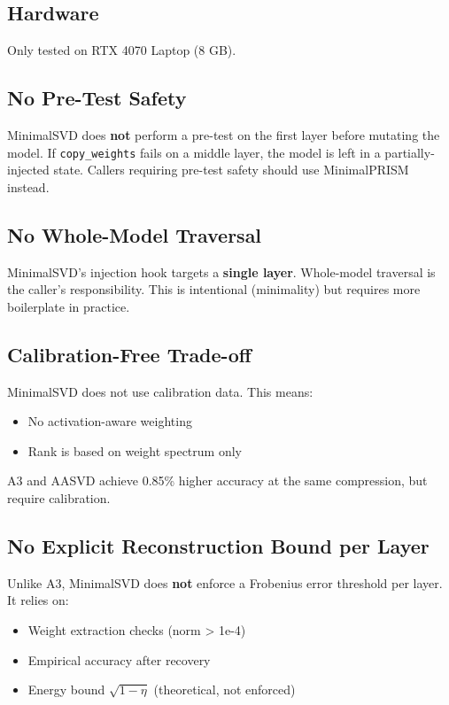 \subsection{Hardware}

Only tested on RTX 4070 Laptop (8 GB).

\subsection{No Pre-Test Safety}

MinimalSVD does \textbf{not} perform a pre-test on the first layer before mutating 
the model. If \texttt{copy\_weights} fails on a middle layer, the model is left in a 
partially-injected state. Callers requiring pre-test safety should use 
MinimalPRISM instead.

\subsection{No Whole-Model Traversal}

MinimalSVD's injection hook targets a \textbf{single layer}. Whole-model 
traversal is the caller's responsibility. This is intentional (minimality) 
but requires more boilerplate in practice.

\subsection{Calibration-Free Trade-off}

MinimalSVD does not use calibration data. This means:
\begin{itemize}
\item No activation-aware weighting
\item Rank is based on weight spectrum only

\end{itemize}
A3 and AASVD achieve 0.85\% higher accuracy at the same compression, 
but require calibration.

\subsection{No Explicit Reconstruction Bound per Layer}

Unlike A3, MinimalSVD does \textbf{not} enforce a Frobenius error threshold per 
layer. It relies on:
\begin{itemize}
\item Weight extraction checks (norm > 1e-4)
\item Empirical accuracy after recovery
\item Energy bound $\sqrt{1 - \eta}$ (theoretical, not enforced)

\end{itemize}
